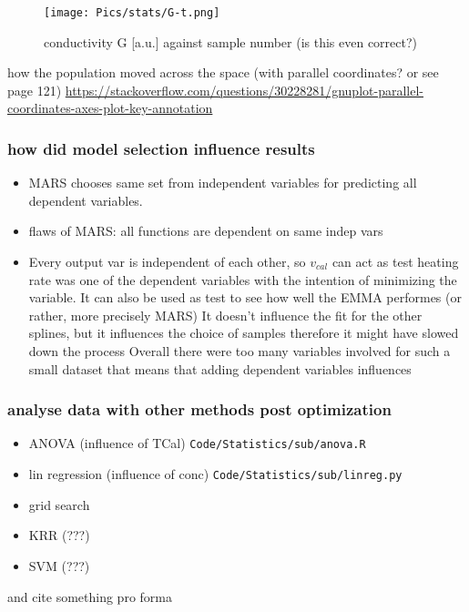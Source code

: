 \begin{figure}
    \centering
    \texttt{[image: Pics/stats/G-t.png]}
    \caption{conductivity G [a.u.] against sample number (is this even correct?)}
    \label{fig:G-t}
\end{figure}

     how the population moved across the space (with parallel coordinates? or see page 121)
        \url{https://stackoverflow.com/questions/30228281/gnuplot-parallel-coordinates-axes-plot-key-annotation}

\subsubsection{how did model selection influence results}
\begin{itemize}
    \item MARS chooses same set from independent variables for predicting all dependent variables. 
    \item flaws of MARS: all functions are dependent on same indep vars
    \item Every output var is independent of each other, so $v_{cal}$ can act as test 
heating rate was one of the dependent variables with the intention of minimizing the variable. 
It can also be used as test to see how well the EMMA performes (or rather, more precisely MARS)
It doesn't influence the fit for the other splines, but it influences the choice of samples therefore it might have slowed down the process
Overall there were too many variables involved for such a small dataset
        that means that adding dependent variables influences 
\end{itemize}

\subsubsection{analyse data with other methods post optimization}
\begin{itemize}
    \item ANOVA (influence of TCal) \texttt{Code/Statistics/sub/anova.R}
    \item lin regression (influence of conc) \texttt{Code/Statistics/sub/linreg.py}
    \item grid search 
    \item KRR (???)
    \item SVM (???)
\end{itemize}

and cite something pro forma \cite{ncbi1butanol}
